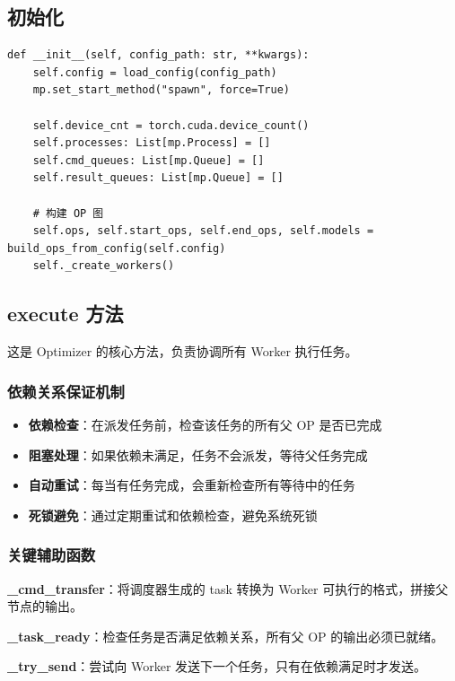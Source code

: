 \documentclass[12pt,a4paper]{article}
\begin{document}
\subsection{初始化}

\begin{lstlisting}
def __init__(self, config_path: str, **kwargs):
    self.config = load_config(config_path)
    mp.set_start_method("spawn", force=True)
    
    self.device_cnt = torch.cuda.device_count()
    self.processes: List[mp.Process] = []
    self.cmd_queues: List[mp.Queue] = []
    self.result_queues: List[mp.Queue] = []
    
    # 构建 OP 图
    self.ops, self.start_ops, self.end_ops, self.models = build_ops_from_config(self.config)
    self._create_workers()
\end{lstlisting}

\subsection{execute 方法}

这是 Optimizer 的核心方法，负责协调所有 Worker 执行任务。

\subsubsection{依赖关系保证机制}

\begin{itemize}
    \item \textbf{依赖检查}：在派发任务前，检查该任务的所有父 OP 是否已完成
    \item \textbf{阻塞处理}：如果依赖未满足，任务不会派发，等待父任务完成
    \item \textbf{自动重试}：每当有任务完成，会重新检查所有等待中的任务
    \item \textbf{死锁避免}：通过定期重试和依赖检查，避免系统死锁
\end{itemize}

\subsubsection{关键辅助函数}

\textbf{\_cmd\_transfer}：将调度器生成的 task 转换为 Worker 可执行的格式，拼接父节点的输出。

\textbf{\_task\_ready}：检查任务是否满足依赖关系，所有父 OP 的输出必须已就绪。

\textbf{\_try\_send}：尝试向 Worker 发送下一个任务，只有在依赖满足时才发送。
\end{document}
